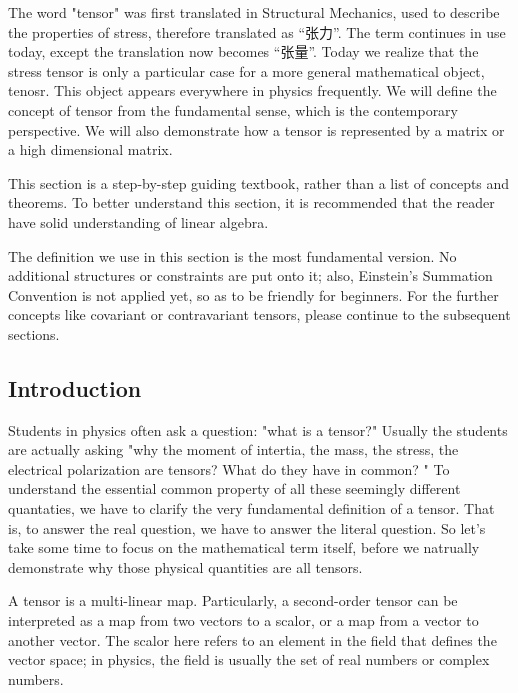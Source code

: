

The word "tensor" was first translated in Structural Mechanics, used to describe the properties of stress, therefore translated as “张力”. The term continues in use today, except the translation now becomes “张量”. Today we realize that the stress tensor is only a particular case for a more general mathematical object, tenosr. This object appears everywhere in physics frequently. We will define the concept of tensor from the fundamental sense, which is the contemporary perspective. We will also demonstrate how a tensor is represented by a matrix or a high dimensional matrix. 

This section is a step-by-step guiding textbook, rather than a list of concepts and theorems. To better understand this section, it is recommended that the reader have solid understanding of linear algebra. 

The definition we use in this section is the most fundamental version. No additional structures or constraints are put onto it; also, Einstein's Summation Convention is not applied yet, so as to be friendly for beginners. For the further concepts like covariant or contravariant tensors, please continue to the subsequent sections. 



\subsection{Introduction}

Students in physics often ask a question: "what is a tensor?" Usually the students are actually asking "why the moment of intertia, the mass, the stress, the electrical polarization are tensors? What do they have in common? " To understand the essential common property of all these seemingly different quantaties, we have to clarify the very fundamental definition of a tensor. That is, to answer the real question, we have to answer the literal question. So let's take some time to focus on the mathematical term itself, before we natrually demonstrate why those physical quantities are all tensors. 

A tensor is a multi-linear map. Particularly, a second-order tensor can be interpreted as a map from two vectors to a scalor, or a map from a vector to another vector. The scalor here refers to an element in the field that defines the vector space; in physics, the field is usually the set of real numbers or complex numbers. 

